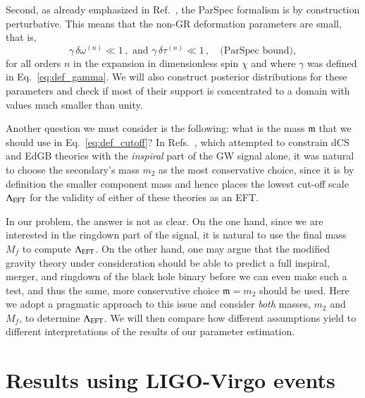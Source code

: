 \documentclass[twocolumn,
               prd,
               aps,
               superscriptaddress,
               tightenlines,
               nofootinbib,
               eqsecnum,
               amsfonts,
               amsmath,
               longbibliography]{revtex4-1}
\newcommand{\gm}{\mathfrak{m}}
\newcommand{\hs}[1]{{\textcolor{blue}{{[HS: #1]}} }}
\begin{document}
Second, as already emphasized in Ref.~\cite{Maselli:2019mjd}, the ParSpec
formalism is by construction perturbative. This means that the non-GR
deformation parameters are small, that is,
%
\begin{equation}
\gamma \, \delta \omega^{(n)} \ll 1 \,,
\,\, \textrm{and} \,\,
\gamma \, \delta \tau^{(n)} \ll 1 \,, \quad \textrm{(ParSpec bound)},
\label{eq:parspec_bound}
\end{equation}
%
for all orders $n$ in the expansion in dimensionless spin $\chi$ and where $\gamma$
was defined in Eq.~\eqref{eq:def_gamma}.
%
We will also construct posterior distributions for these parameters and check if
most of their support is concentrated to a domain with values much smaller than
unity.

Another question we must consider is the following: what is the mass $\mathfrak{m}$ that we should use
in Eq.~\eqref{eq:def_cutoff}?
%
In Refs.~\cite{Nair:2019iur,Perkins:2021mhb,Lyu:2022gdr}, which attempted to
constrain dCS and EdGB theories with the \emph{inspiral} part of
the GW signal alone, it was natural to choose the secondary's mass $m_2$ as the most
conservative choice, since it is by definition the smaller component mass and hence
places the lowest cut-off scale $\Lambda_{\rm EFT}$ for the validity of either of these theories as an EFT.

In our problem, the answer is not as clear. On the one hand, since we are
interested in the ringdown part of the signal, it is natural to use the
final mass $M_f$ to compute $\Lambda_{\rm EFT}$.
%
On the other hand, one may argue that the modified gravity theory under
consideration should be able to predict a full inspiral, merger, and ringdown
of the black hole binary before we can even make such a test, and thus the
same, more conservative choice $\gm = m_2$ should be used.
%
Here we adopt a pragmatic approach to this issue and consider \emph{both}
masses, $m_2$ and $M_f$, to determine $\Lambda_{\rm EFT}$.
%
We will then compare how different assumptions yield to different
interpretations of the results of our parameter estimation.



\section{Results using LIGO-Virgo events}
\label{sec:results}

\end{document}
